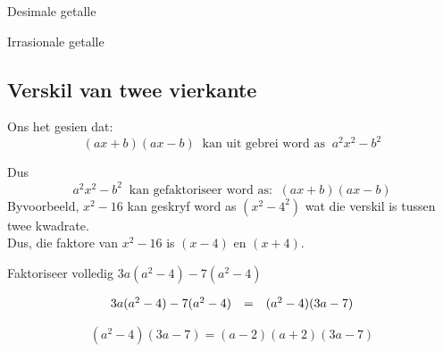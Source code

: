 \begin{Aktiwiteit}{Desimale getalle}
\begin{aktiwiteit}{Irrasionale getalle}
\begin{exercises}{}
\end{exercises}

\subsection* {Verskil van twee vierkante}
Ons het gesien dat: 
\begin{equation*}
(ax+b)(ax-b)~\mbox{ kan uit gebrei word as }~{a}^{2}{x}^{2}-{b}^{2}
\end{equation*}

Dus
\begin{equation*}
{a}^{2}{x}^{2}-{b}^{2}~\mbox{ kan gefaktoriseer word as: }~(ax+b)(ax-b)
\end{equation*}
Byvoorbeeld, ${x}^{2}-16$ kan geskryf word as $({x}^{2}-{4}^{2})$ wat die verskil is tussen twee kwadrate. 
\\Dus, die faktore van ${x}^{2}-16$ is $(x-4)$ en $(x+4)$.\par 





\begin{wex}{}
{Faktoriseer volledig $3a(a^2-4)-7(a^2-4)$ \par }

{


\begin{equation*}
\begin{array}{ccc}\hfill 3a(a^2-4)-7(a^2-4)& =& (a^2-4)(3a-7)\hfill \end{array}
\end{equation*}


$$
(a^2-4)(3a-7) = (a-2)(a+2)(3a-7)
$$

}
\end{wex}



\end{aktiwiteit}
\end{Aktiwiteit}
